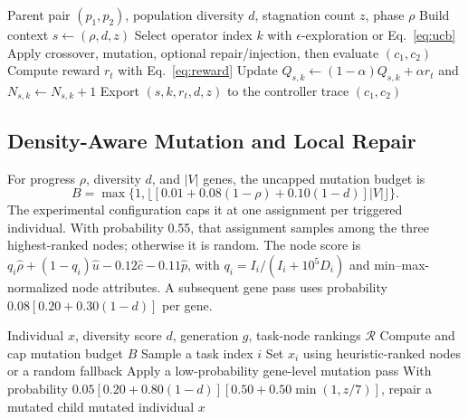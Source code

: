\documentclass[preprint,12pt]{elsarticle}
\begin{document}
\begin{algorithm}[H]
\caption{ADARE Pareto-Contextual UCB Crossover Control}
\label{alg:ucb_control}
\small
\begin{algorithmic}[1]
\Require Parent pair $(p_1,p_2)$, population diversity $d$, stagnation count $z$, phase $\rho$
\State Build context $s \gets (\rho,d,z)$ 
\State Select operator index $k$ with $\epsilon$-exploration or Eq.~\eqref{eq:ucb} 
\State Apply crossover, mutation, optional repair/injection, then evaluate $(c_1,c_2)$
\State Compute reward $r_t$ with Eq.~\eqref{eq:reward} 
\State Update $Q_{s,k} \leftarrow (1-\alpha)Q_{s,k} + \alpha r_t$ and $N_{s,k} \leftarrow N_{s,k} + 1$
\State Export $(s,k,r_t,d,z)$ to the controller trace 
\State \Return $(c_1,c_2)$
\end{algorithmic}
\end{algorithm}

\subsection{Density-Aware Mutation and Local Repair}
For progress $\rho$, diversity $d$, and $|V|$ genes, the uncapped mutation budget is
\begin{equation}
B=\max\{1,\lfloor[0.01+0.08(1-\rho)+0.10(1-d)]|V|\rfloor\}.
\end{equation}
The experimental configuration caps it at one assignment per triggered individual. With probability 0.55, that assignment samples among the three highest-ranked nodes; otherwise it is random. The node score is $q_i\hat\rho+(1-q_i)\hat u-0.12\hat c-0.11\hat p$, with $q_i=I_i/(I_i+10^5D_i)$ and min--max-normalized node attributes. A subsequent gene pass uses probability $0.08[0.20+0.30(1-d)]$ per gene.

\begin{algorithm}[H]
\caption{Density-Aware Mutation with Heuristic Guidance}
\label{alg:density_mutation}
\small
\begin{algorithmic}[1]
\Require Individual $x$, diversity score $d$, generation $g$, task-node rankings $\mathcal{R}$
\State Compute and cap mutation budget $B$ 
    \State Sample a task index $i$
    \State Set $x_i$ using heuristic-ranked nodes or a random fallback
\EndFor
\State Apply a low-probability gene-level mutation pass 
\State With probability $0.05[0.20+0.80(1-d)][0.50+0.50\min(1,z/7)]$, repair a mutated child 
\State \Return mutated individual $x$
\end{algorithmic}
\end{algorithm}
\end{document}
